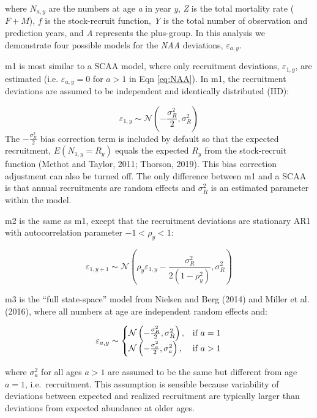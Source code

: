 \documentclass[]{article}
\begin{document}
where \(N_{a,y}\) are the numbers at age \emph{a} in year \emph{y},
\emph{Z} is the total mortality rate (\(F + M\)), \(f\) is the
stock-recruit function, \emph{Y} is the total number of observation and
prediction years, and \emph{A} represents the plus-group. In this
analysis we demonstrate four possible models for the \emph{NAA}
deviations, \(\varepsilon_{a,y}\).

m1 is most similar to a SCAA model, where only recruitment deviations,
\(\varepsilon_{1,y}\), are estimated (i.e. \(\varepsilon_{a,y} = 0\) for
\(a > 1\) in Eqn \ref{eq:NAA}). In m1, the recruitment deviations are
assumed to be independent and identically distributed (IID):

\[\varepsilon_{1,y} \sim \mathcal{N}\left( - \frac{\sigma^2_R}{2}, \sigma^2_R \right)\]
The \(- \frac{\sigma^2_R}{2}\) bias correction term is included by
default so that the expected recruitment, \(E(N_{1,y} = R_y)\) equals
the expected \(R_y\) from the stock-recruit function (Methot and Taylor,
2011; Thorson, 2019). This bias correction adjustment can also be turned
off. The only difference between m1 and a SCAA is that annual
recruitments are random effects and \(\sigma^2_R\) is an estimated
parameter within the model.

m2 is the same as m1, except that the recruitment deviations are
stationary AR1 with autocorrelation parameter \(-1<\rho_y<1\):

\[\varepsilon_{1,y+1} \sim \mathcal{N}\left(\rho_y \varepsilon_{1,y} - \frac{\sigma^2_R}{2 (1-\rho^2_y)}, \sigma^2_R \right)\]

m3 is the ``full state-space'' model from Nielsen and Berg (2014) and
Miller et al. (2016), where all numbers at age are independent random
effects and:

\begin{equation}
  \varepsilon_{a,y} \sim \left\{
    \begin{array}{@{}ll@{}}
      \mathcal{N} \left( - \frac{\sigma^2_R}{2}, \sigma^2_R \right), & \text{if}\ a = 1 \\
      \mathcal{N} \left( - \frac{\sigma^2_a}{2}, \sigma^2_a \right), & \text{if}\ a > 1
    \end{array}\right.
\end{equation}

where \(\sigma^2_a\) for all ages \(a > 1\) are assumed to be the same
but different from age \(a = 1\), i.e.~recruitment. This assumption is
sensible because variability of deviations between expected and realized
recruitment are typically larger than deviations from expected abundance
at older ages.
\end{document}
